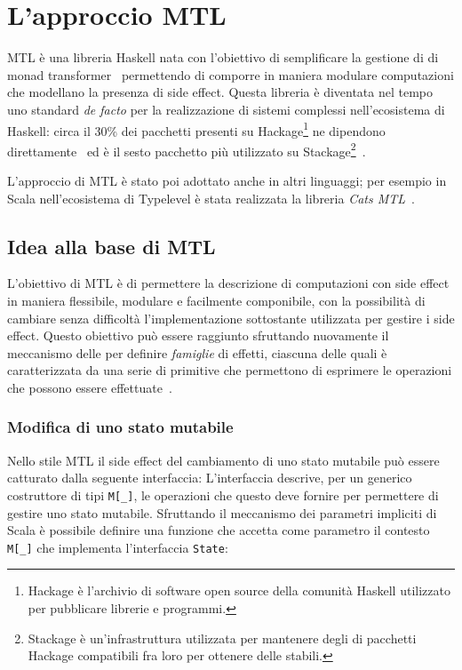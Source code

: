 \section{L'approccio MTL}

\acf{MTL} è una libreria Haskell nata con l'obiettivo di semplificare la gestione di  di monad transformer~\cite{cit:mtl} permettendo di comporre in maniera modulare computazioni che modellano la presenza di side effect.
Questa libreria è diventata nel tempo uno standard \emph{de facto} per la realizzazione di sistemi complessi nell'ecosistema di Haskell: circa il 30\% dei pacchetti presenti su Hackage\footnote{Hackage è l'archivio di software open source della comunità Haskell utilizzato per pubblicare librerie e programmi.} ne dipendono direttamente~\cite{cit:which-monads-haskell-developers-use-an-exploratory-study} ed è il sesto pacchetto più utilizzato su Stackage\footnote{Stackage è un'infrastruttura utilizzata per mantenere degli  di pacchetti Hackage compatibili fra loro per ottenere delle  stabili.}~\cite{cit:evolution-of-a-haskell-repository-and-its-use-of-monads-an-exploratory-study-of-stackage}.

L'approccio di \ac{MTL} è stato poi adottato anche in altri linguaggi; per esempio in Scala nell'ecosistema di Typelevel è stata realizzata la libreria \emph{Cats MTL}~\cite{cit:cats-mtl}.

\subsection{Idea alla base di MTL}
L'obiettivo di \ac{MTL} è di permettere la descrizione di computazioni con side effect in maniera flessibile, modulare e facilmente componibile, con la possibilità di cambiare senza difficoltà l'implementazione sottostante utilizzata per gestire i side effect.
Questo obiettivo può essere raggiunto sfruttando nuovamente il meccanismo delle  per definire \emph{famiglie} di effetti, ciascuna delle quali è caratterizzata da una serie di primitive che permettono di esprimere le operazioni che possono essere effettuate~\cite{cit:functional-programming-with-overloading-and-higher-order-polymorphism}.

\subsubsection{Modifica di uno stato mutabile}
Nello stile \ac{MTL} il side effect del cambiamento di uno stato mutabile può essere catturato dalla seguente interfaccia:
L'interfaccia descrive, per un generico costruttore di tipi \lstinline{M[_]}, le operazioni che questo deve fornire per permettere di gestire uno stato mutabile.
Sfruttando il meccanismo dei parametri impliciti di Scala è possibile definire una funzione che accetta come parametro il contesto \lstinline{M[_]} che implementa l'interfaccia \lstinline{State}:

